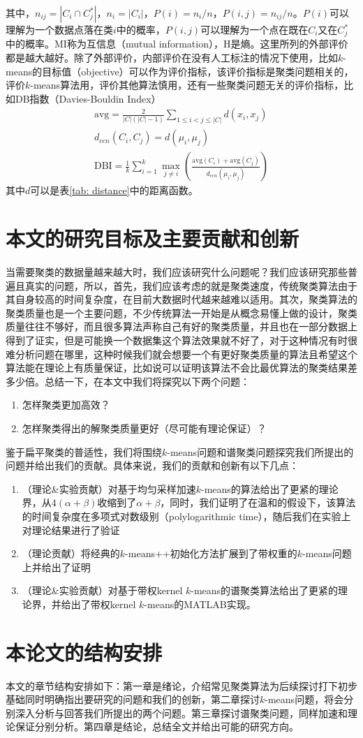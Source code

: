 其中，$n_{ij}=|C_i \cap C_j^*|$，$n_i = |C_i|$，$P(i) = n_i/n$，$P(i,j)=n_{ij}/n$。$P(i)$可以理解为一个数据点落在类$i$中的概率，$P(i,j)$可以理解为一个点在既在$C_i$又在$C_j^*$中的概率。MI称为互信息（mutual information），H是熵。这里所列的外部评价都是越大越好。除了外部评价，内部评价在没有人工标注的情况下使用，比如$k$-means的目标值（objective）可以作为评价指标，该评价指标是聚类问题相关的，评价$k$-means算法用，评价其他算法慎用，还有一些聚类问题无关的评价指标，比如DB指数（Davies-Bouldin Index）
\begin{gather}
    \text{avg} = \frac{2}{|C|(|C|-1)}\sum_{1\leq i<j \leq |C| }d(x_i,x_j) \\
    d_{cen}(C_i,C_j) = d(\mu_i,\mu_j) \\
    \text{DBI} = \frac{1}{k}\sum_{i=1}^k \max_{j \neq i} (\frac{\text{avg}(C_i)+\text{avg}(C_j)}{d_{cen}(\mu_i,\mu_j)})
\end{gather}
其中$d$可以是表\ref{tab: distance}中的距离函数。

\section{本文的研究目标及主要贡献和创新}
当需要聚类的数据量越来越大时，我们应该研究什么问题呢？我们应该研究那些普遍且真实的问题，所以，首先，我们应该考虑的就是聚类速度，传统聚类算法由于其自身较高的时间复杂度，在目前大数据时代越来越难以适用。其次，聚类算法的聚类质量也是一个主要问题，不少传统算法一开始是从概念易懂上做的设计，聚类质量往往不够好，而且很多算法声称自己有好的聚类质量，并且也在一部分数据上得到了证实，但是可能换一个数据集这个算法效果就不好了，对于这种情况有时很难分析问题在哪里，这种时候我们就会想要一个有更好聚类质量的算法且希望这个算法能在理论上有质量保证，比如说可以证明该算法不会比最优算法的聚类结果差多少倍。总结一下，在本文中我们将探究以下两个问题：
\begin{enumerate}
    \item 怎样聚类更加高效？
    \item 怎样聚类得出的解聚类质量更好（尽可能有理论保证）？
\end{enumerate}
鉴于扁平聚类的普适性，我们将围绕$k$-means问题和谱聚类问题探究我们所提出的问题并给出我们的贡献。具体来说，我们的贡献和创新有以下几点：
\begin{enumerate}
    \item （理论\&实验贡献）对基于均匀采样加速$k$-means的算法给出了更紧的理论界，从$4(\alpha+\beta)$收缩到了$\alpha+\beta$，同时，我们证明了在温和的假设下，该算法的时间复杂度在多项式对数级别（polylogarithmic time），随后我们在实验上对理论结果进行了验证
    \item （理论贡献）将经典的$k$-means++初始化方法扩展到了带权重的$k$-means问题上并给出了证明
    \item （理论\&实验贡献）对基于带权kernel $k$-means的谱聚类算法给出了更紧的理论界，并给出了带权kernel $k$-means的MATLAB实现。
\end{enumerate}

\section{本论文的结构安排}
本文的章节结构安排如下：第一章是绪论，介绍常见聚类算法为后续探讨打下初步基础同时明确指出要研究的问题和我们的创新，第二章探讨$k$-means问题，将会分别深入分析与回答我们所提出的两个问题。第三章探讨谱聚类问题，同样加速和理论保证分别分析。第四章是结论，总结全文并给出可能的研究方向。